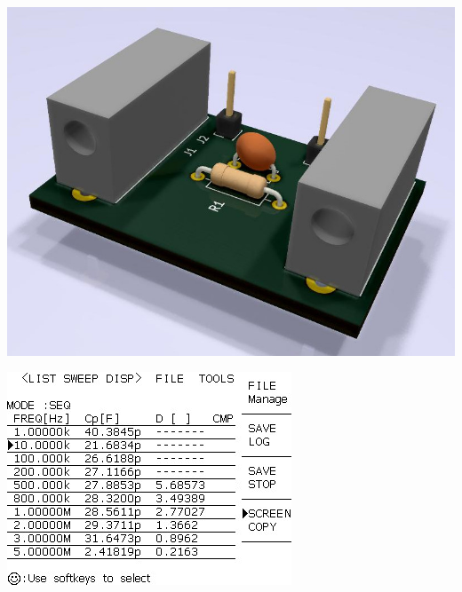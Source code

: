 \begin{minipage}[b]{0.4\linewidth}
    \centering
    \includegraphics[width=\textwidth]{./images/lcr_ebox.jpg}
    \label{fig:ebox_pcb}
\end{minipage}
\hspace{0.5cm}
%
\begin{minipage}[b]{0.5\linewidth}
    \centering
    \includegraphics[width=\textwidth]{./images/lcr_ebox_capacitance.jpg}
    \label{fig:lcr_ebox_capacitance}
\end{minipage}

